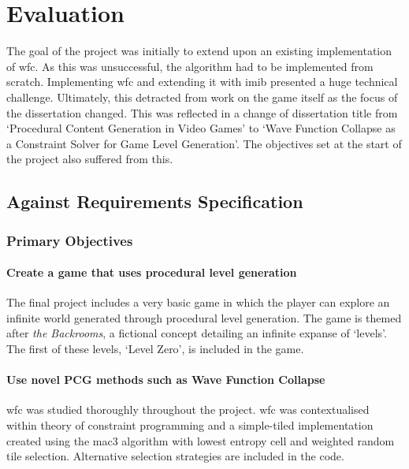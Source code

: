 \chapter{Evaluation}
The goal of the project was initially to extend upon an existing implementation of \acrshort{wfc}. As this was unsuccessful, the algorithm had to be implemented from scratch. Implementing \acrlong{wfc} and extending it with \acrlong{imib} presented a huge technical challenge. Ultimately, this detracted from work on the game itself as the focus of the dissertation changed. This was reflected in a change of dissertation title from `Procedural Content Generation in Video Games' to `Wave Function Collapse as a Constraint Solver for Game Level Generation'. The objectives set at the start of the project also suffered from this.

\section{Against Requirements Specification}
\subsection{Primary Objectives}
\subsubsection{Create a game that uses procedural level generation}
The final project includes a very basic game in which the player can explore an infinite world generated through procedural level generation. The game is themed after \textit{the Backrooms}, a fictional concept detailing an infinite expanse of `levels'. The first of these levels, `Level Zero', is included in the game.

\subsubsection{Use novel PCG methods such as Wave Function Collapse}
\acrlong{wfc} was studied thoroughly throughout the project. \acrshort{wfc} was contextualised within theory of constraint programming and a simple-tiled implementation created using the \acrshort{mac3} algorithm with lowest entropy cell and weighted random tile selection. Alternative selection strategies are included in the code.

